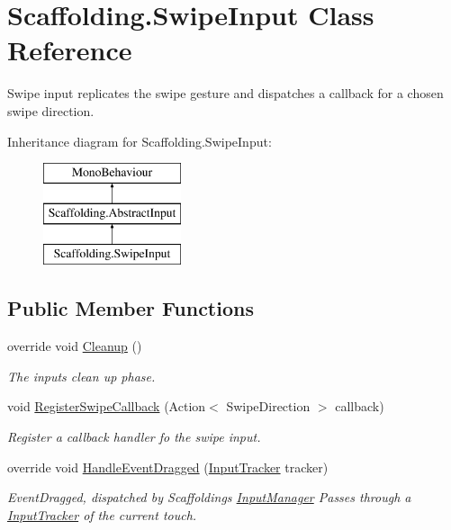\hypertarget{class_scaffolding_1_1_swipe_input}{\section{Scaffolding.\+Swipe\+Input Class Reference}
\label{class_scaffolding_1_1_swipe_input}
}


Swipe input replicates the swipe gesture and dispatches a callback for a chosen swipe direction.  


Inheritance diagram for Scaffolding.\+Swipe\+Input\+:\begin{figure}[H]
\begin{center}
\leavevmode
\includegraphics[height=3.000000cm]{class_scaffolding_1_1_swipe_input}
\end{center}
\end{figure}
\subsection*{Public Member Functions}
\begin{DoxyCompactItemize}
\item 
override void \hyperlink{class_scaffolding_1_1_swipe_input_a5d19c1744df90f14d150241605cb86bf}{Cleanup} ()
\begin{DoxyCompactList}\small\item\em The inputs clean up phase. \end{DoxyCompactList}\item 
void \hyperlink{class_scaffolding_1_1_swipe_input_a00ad2fde21a1aa47c4dbfa36768a0bc3}{Register\+Swipe\+Callback} (Action$<$ Swipe\+Direction $>$ callback)
\begin{DoxyCompactList}\small\item\em Register a callback handler fo the swipe input. \end{DoxyCompactList}\item 
override void \hyperlink{class_scaffolding_1_1_swipe_input_a818aba4106a64b5dde4977bca4b358a7}{Handle\+Event\+Dragged} (\hyperlink{class_scaffolding_1_1_input_tracker}{Input\+Tracker} tracker)
\begin{DoxyCompactList}\small\item\em Event\+Dragged, dispatched by Scaffoldings \hyperlink{class_scaffolding_1_1_input_manager}{Input\+Manager} Passes through a \hyperlink{class_scaffolding_1_1_input_tracker}{Input\+Tracker} of the current touch. \end{DoxyCompactList}\end{DoxyCompactItemize}
